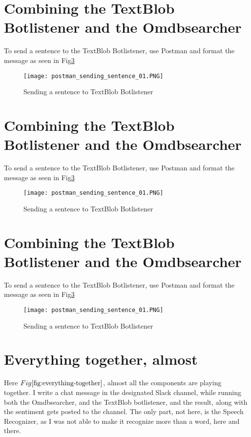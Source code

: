 \documentclass[11pt,fleqn]{book} %
\begin{document}
\section{Combining the TextBlob Botlistener and the Omdbsearcher}
To send a sentence to the TextBlob Botlistener, use Postman and format the message as seen in Fig\ref{fig:sending-botlistener}
\begin{figure}[]
  \centering
   \texttt{[image: postman\_sending\_sentence\_01.PNG]}
  \caption{Sending a sentence to TextBlob Botlistener}
  \label{fig:sending-botlistener}
\end{figure}
\newpage
\section{Combining the TextBlob Botlistener and the Omdbsearcher}
To send a sentence to the TextBlob Botlistener, use Postman and format the message as seen in Fig\ref{fig:sending-botlistener}
\begin{figure}[]
  \centering
   \texttt{[image: postman\_sending\_sentence\_01.PNG]}
  \caption{Sending a sentence to TextBlob Botlistener}
  \label{fig:sending-botlistener}
\end{figure}
\newpage
\section{Combining the TextBlob Botlistener and the Omdbsearcher}
To send a sentence to the TextBlob Botlistener, use Postman and format the message as seen in Fig\ref{fig:sending-botlistener}
\begin{figure}[]
  \centering
   \texttt{[image: postman\_sending\_sentence\_01.PNG]}
  \caption{Sending a sentence to TextBlob Botlistener}
  \label{fig:sending-botlistener}
\end{figure}

\newpage
\section{Everything together, almost}
Here \(Fig\ref{fig:everything-together}\), almost all the components are playing together. I write a chat message in the designated Slack channel, while running both the Omdbsearcher, and the TextBlob botlistener, and the result, along with the sentiment gets posted to the channel.
The only part, not here, is the Speech Recognizer, as I was not able to make it recognize more than a word, here and there.
\end{document}
